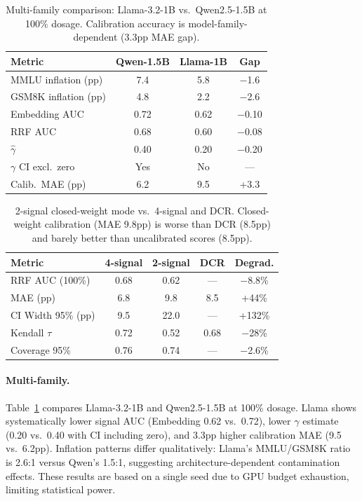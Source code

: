 \documentclass[letterpaper,11pt]{article}
\begin{document}
\begin{table}[t]
\centering
\caption{Multi-family comparison: Llama-3.2-1B vs.\ Qwen2.5-1.5B at 100\% dosage. Calibration accuracy is model-family-dependent (3.3pp MAE gap).}
\label{tab:multi_family}
\begin{tabular}{@{}lccc@{}}
\toprule
Metric & Qwen-1.5B & Llama-1B & Gap \\
\midrule
MMLU inflation (pp) & 7.4 & 5.8 & $-$1.6 \\
GSM8K inflation (pp) & 4.8 & 2.2 & $-$2.6 \\
Embedding AUC & 0.72 & 0.62 & $-$0.10 \\
RRF AUC & 0.68 & 0.60 & $-$0.08 \\
$\hat{\gamma}$ & 0.40 & 0.20 & $-$0.20 \\
$\gamma$ CI excl.\ zero & Yes & No & --- \\
Calib.\ MAE (pp) & 6.2 & 9.5 & +3.3 \\
\bottomrule
\end{tabular}
\end{table}

\begin{table}[t]
\centering
\caption{2-signal closed-weight mode vs.\ 4-signal and DCR. Closed-weight calibration (MAE 9.8pp) is worse than DCR (8.5pp) and barely better than uncalibrated scores (8.5pp).}
\label{tab:closed_weight}
\begin{tabular}{@{}lcccc@{}}
\toprule
Metric & 4-signal & 2-signal & DCR & Degrad. \\
\midrule
RRF AUC (100\%) & 0.68 & 0.62 & --- & $-$8.8\% \\
MAE (pp) & 6.8 & 9.8 & 8.5 & +44\% \\
CI Width 95\% (pp) & 9.5 & 22.0 & --- & +132\% \\
Kendall $\tau$ & 0.72 & 0.52 & 0.68 & $-$28\% \\
Coverage 95\% & 0.76 & 0.74 & --- & $-$2.6\% \\
\bottomrule
\end{tabular}
\end{table}

\paragraph{Multi-family.} Table~\ref{tab:multi_family} compares Llama-3.2-1B and Qwen2.5-1.5B at 100\% dosage.
Llama shows systematically lower signal AUC (Embedding 0.62 vs.\ 0.72), lower $\gamma$ estimate (0.20 vs.\ 0.40 with CI including zero), and 3.3pp higher calibration MAE (9.5 vs.\ 6.2pp).
Inflation patterns differ qualitatively: Llama's MMLU/GSM8K ratio is 2.6:1 versus Qwen's 1.5:1, suggesting architecture-dependent contamination effects.
These results are based on a single seed due to GPU budget exhaustion, limiting statistical power.
\end{document}
